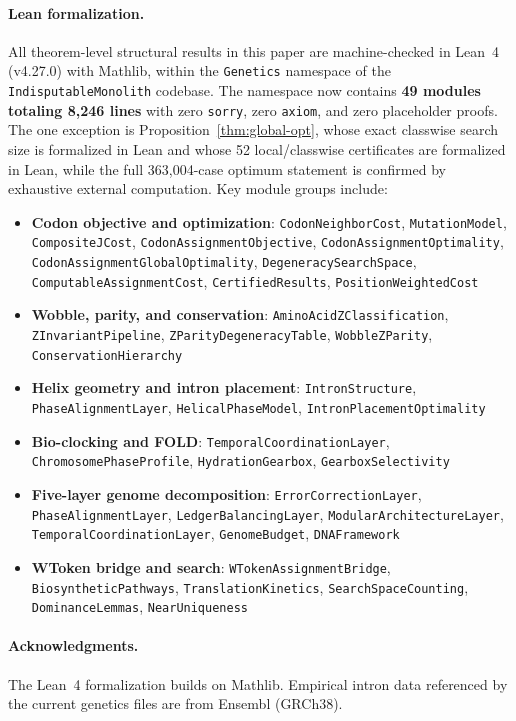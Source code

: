 \documentclass[11pt,a4paper]{article}
\begin{document}
\paragraph{Lean formalization.}
All theorem-level structural results in this paper are machine-checked in Lean~4 (v4.27.0) with Mathlib, within the \texttt{Genetics} namespace of the \texttt{IndisputableMonolith} codebase. The namespace now contains \textbf{49 modules totaling 8,246 lines} with zero \texttt{sorry}, zero \texttt{axiom}, and zero placeholder proofs. The one exception is Proposition~\ref{thm:global-opt}, whose exact classwise search size is formalized in Lean and whose 52 local/classwise certificates are formalized in Lean, while the full 363,004-case optimum statement is confirmed by exhaustive external computation. Key module groups include:
\begin{itemize}[nosep]
\item \textbf{Codon objective and optimization}: \texttt{CodonNeighborCost}, \texttt{MutationModel}, \texttt{CompositeJCost}, \texttt{CodonAssignmentObjective}, \texttt{CodonAssignmentOptimality}, \texttt{CodonAssignmentGlobalOptimality}, \texttt{DegeneracySearchSpace}, \texttt{ComputableAssignmentCost}, \texttt{CertifiedResults}, \texttt{PositionWeightedCost}
\item \textbf{Wobble, parity, and conservation}: \texttt{AminoAcidZClassification}, \texttt{ZInvariantPipeline}, \texttt{ZParityDegeneracyTable}, \texttt{WobbleZParity}, \texttt{ConservationHierarchy}
\item \textbf{Helix geometry and intron placement}: \texttt{IntronStructure}, \texttt{PhaseAlignmentLayer}, \texttt{HelicalPhaseModel}, \texttt{IntronPlacementOptimality}
\item \textbf{Bio-clocking and FOLD}: \texttt{TemporalCoordinationLayer}, \texttt{ChromosomePhaseProfile}, \texttt{HydrationGearbox}, \texttt{GearboxSelectivity}
\item \textbf{Five-layer genome decomposition}: \texttt{ErrorCorrectionLayer}, \texttt{PhaseAlignmentLayer}, \texttt{LedgerBalancingLayer}, \texttt{ModularArchitectureLayer}, \texttt{TemporalCoordinationLayer}, \texttt{GenomeBudget}, \texttt{DNAFramework}
\item \textbf{WToken bridge and search}: \texttt{WTokenAssignmentBridge}, \texttt{BiosyntheticPathways}, \texttt{TranslationKinetics}, \texttt{SearchSpaceCounting}, \texttt{DominanceLemmas}, \texttt{NearUniqueness}
\end{itemize}

\paragraph{Acknowledgments.}
The Lean~4 formalization builds on Mathlib. Empirical intron data referenced by the current genetics files are from Ensembl (GRCh38).
\end{document}
